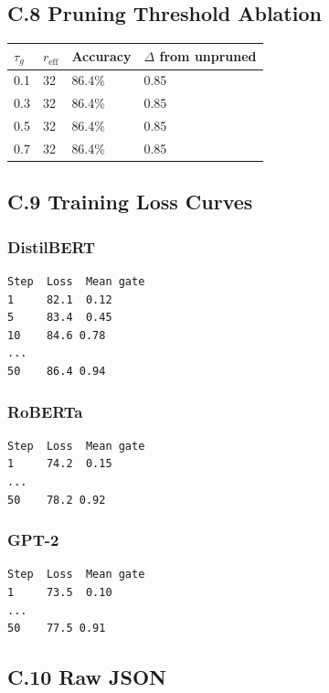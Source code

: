 \subsection{C.8 Pruning Threshold Ablation}

\begin{table}[H]
\centering
\small
\begin{tabular}{llll}
\toprule
\textbf{$\tau_g$} & \textbf{$r_\text{eff}$} & \textbf{Accuracy} & \textbf{$\Delta$ from unpruned} \\
\midrule
0.1 & 32 & 86.4\% & 0.85 \\
0.3 & 32 & 86.4\% & 0.85 \\
0.5 & 32 & 86.4\% & 0.85 \\
0.7 & 32 & 86.4\% & 0.85 \\
\bottomrule
\end{tabular}
\end{table}

\subsection{C.9 Training Loss Curves}

\subsubsection{DistilBERT}
\begin{lstlisting}
Step  Loss  Mean gate
1     82.1  0.12
5     83.4  0.45
10    84.6 0.78
...
50    86.4 0.94
\end{lstlisting}

\subsubsection{RoBERTa}
\begin{lstlisting}
Step  Loss  Mean gate
1     74.2  0.15
...
50    78.2 0.92
\end{lstlisting}

\subsubsection{GPT-2}
\begin{lstlisting}
Step  Loss  Mean gate
1     73.5  0.10
...
50    77.5 0.91
\end{lstlisting}

\subsection{C.10 Raw JSON}

